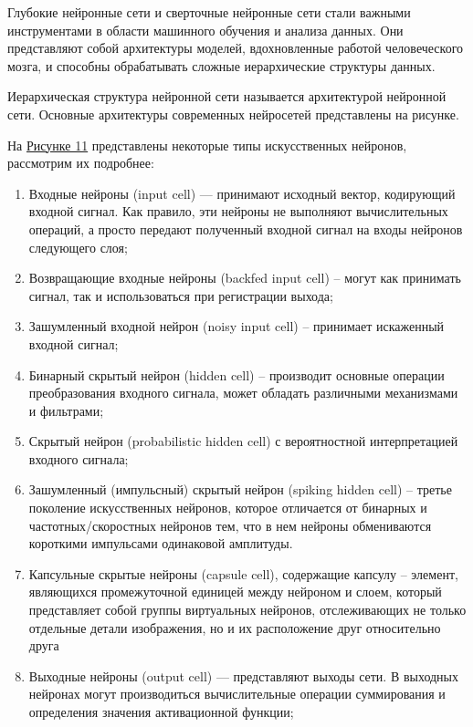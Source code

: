     Глубокие нейронные сети и сверточные нейронные сети стали важными инструментами в области машинного обучения и анализа данных. Они представляют собой архитектуры моделей, вдохновленные работой человеческого мозга, и способны обрабатывать сложные иерархические структуры данных.
    
    Иерархическая структура нейронной сети называется архитектурой нейронной сети. Основные архитектуры современных нейросетей представлены на рисунке.
    
    На \hyperref[fig:artificial_neural_networks_architecture]{Рисунке 11} представлены некоторые типы искусственных нейронов, рассмотрим их подробнее:

    \begin{enumerate}
        \item Входные нейроны (input cell) — принимают исходный вектор, кодирующий входной сигнал. Как правило, эти нейроны не выполняют вычислительных операций, а просто передают полученный входной сигнал на входы нейронов следующего слоя;
        \item Возвращающие входные нейроны (backfed input cell) – могут как принимать сигнал, так и использоваться при регистрации выхода;
        \item Зашумленный входной нейрон (noisy input cell) – принимает искаженный входной сигнал;
        \item Бинарный скрытый нейрон (hidden cell) – производит основные операции преобразования входного сигнала, может обладать различными механизмами и фильтрами;
        \item Скрытый нейрон (probabilistic hidden cell) с вероятностной интерпретацией входного сигнала;
        \item Зашумленный (импульсный) скрытый нейрон (spiking hidden cell) – третье поколение искусственных нейронов, которое отличается от бинарных и частотных/скоростных нейронов тем, что в нем нейроны обмениваются короткими импульсами одинаковой амплитуды.
        \item Капсульные скрытые нейроны (capsule cell), содержащие капсулу – элемент, являющихся промежуточной единицей между нейроном и слоем, который представляет собой группы виртуальных нейронов, отслеживающих не только отдельные детали изображения, но и их расположение друг относительно друга
        \item Выходные нейроны (output cell) — представляют выходы сети. В выходных нейронах могут производиться вычислительные операции суммирования и определения значения активационной функции;

\end{enumerate}
